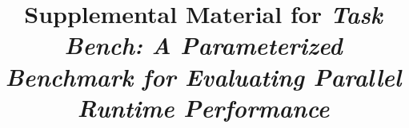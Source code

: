 



\title{Supplemental Material for \emph{Task Bench: A Parameterized Benchmark for Evaluating Parallel Runtime Performance}}

\maketitle

\appendix







